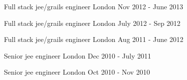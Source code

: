 \begin{cventries}
    \cventry
    {Full stack jee/grails engineer}
    {} %
    {London} %
    {Nov 2012 - June 2013} %
    {}
    {}

    \cventry
    {Full stack jee/grails engineer}
    {} %
    {London} %
    {July 2012 - Sep 2012} %
    {}
    {}

    \cventry
    {Full stack jee/grails engineer}
    {} %
    {London} %
    {Aug 2011 - June 2012} %
    {}
    {}

    \cventry
    {Senior jee engineer}
    {} %
    {London} %
    {Dec 2010 - July 2011} %
    {}
    {}

    \cventry
    {Senior jee engineer}
    {} %
    {London} %
    {Oct 2010 - Nov 2010} %
    {}
    {}
\end{cventries}



